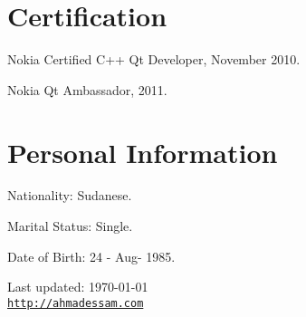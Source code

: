 \documentclass[letterpaper]{article}
\def\footerlink{http://ahmadessam.com}
\renewenvironment{itemize}{
  \begin{list}{}{
    \setlength{\leftmargin}{1.5em}
  }
}{
  \end{list}
}
\begin{document}
\section*{Certification}
\begin{itemize}
\item Nokia Certified C++ Qt Developer, November 2010.
\item Nokia Qt Ambassador, 2011.
\end{itemize}



\section*{Personal Information}
\begin{itemize}
\item Nationality: {\small Sudanese.}
\item Marital Status: {\small Single.}
\item Date of Birth: {\small 24 - Aug- 1985.}
\end{itemize}

\bigskip

\begin{center}
  \begin{footnotesize}
    Last updated: \today \\
    \href{\footerlink}{\texttt{\footerlink}}
  \end{footnotesize}
\end{center}
\end{document}

